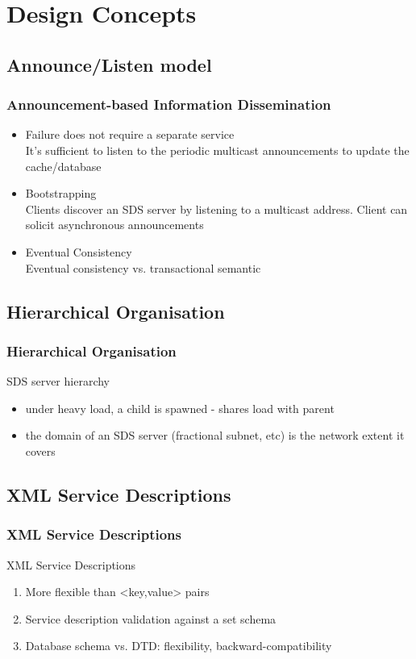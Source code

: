 \documentclass{beamer}
\begin{document}
\section{Design Concepts} 
\subsection{Announce/Listen model} 

\begin{frame}
\frametitle{Announcement-based Information Dissemination}
\begin{itemize}
\item \alert<+>{Failure does not require a separate service} \hfill \\
It's sufficient to listen to the periodic multicast announcements to update the cache/database
\item \alert<+>{Bootstrapping} \hfill \\
Clients discover an SDS server by listening to a multicast address. Client can solicit asynchronous announcements
\item \alert<+>{Eventual Consistency} \hfill \\
Eventual consistency vs. transactional semantic
\end{itemize}
\end{frame}

\subsection{Hierarchical Organisation}
\begin{frame}
\frametitle{Hierarchical Organisation}
\begin{block}{SDS server hierarchy}
\begin{itemize}
\item under heavy load, a child is spawned - shares load with parent
\item the domain of an SDS server (fractional subnet, etc) is the network extent it covers
\end{itemize}
\end{block}
\end{frame}

\subsection{XML Service Descriptions}
\begin{frame}
\frametitle{XML Service Descriptions}
\begin{block}{XML Service Descriptions}
\begin{enumerate}
\item More flexible than <key,value> pairs
\item Service description validation against a set schema
\item Database schema vs. DTD: flexibility, backward-compatibility
\end{enumerate}
\end{block}
\end{frame}
\end{document}
